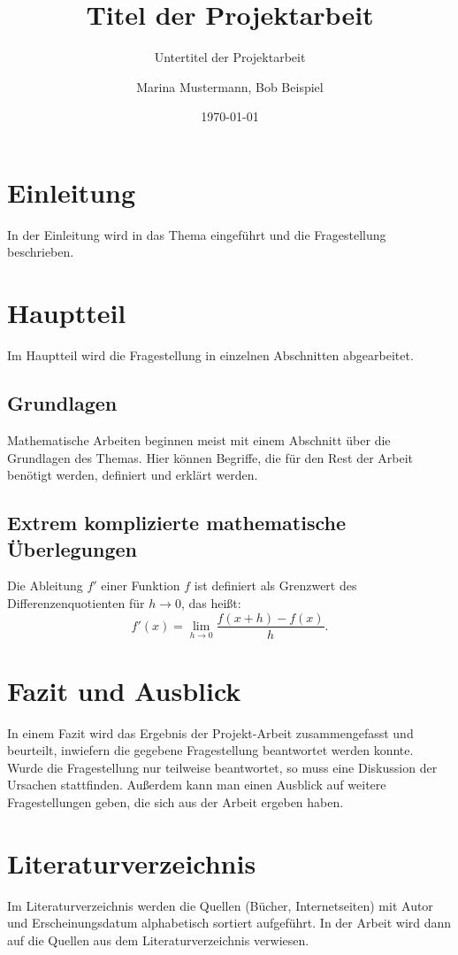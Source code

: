 \documentclass[11pt,parskip=half]{scrartcl} %
\begin{document}
\author{Marina Mustermann, Bob Beispiel}
\title{Titel der Projektarbeit}
\subtitle{Untertitel der Projektarbeit}
\date{\today}
\maketitle

\tableofcontents

\section{Einleitung}
In der Einleitung wird in das Thema eingeführt und die Fragestellung beschrieben.

\section{Hauptteil}
Im Hauptteil wird die Fragestellung in einzelnen Abschnitten abgearbeitet.
\subsection{Grundlagen}
Mathematische Arbeiten beginnen meist mit einem Abschnitt über die Grundlagen des Themas. Hier können Begriffe, die für den Rest der Arbeit benötigt werden, definiert und erklärt werden.
\subsection{Extrem komplizierte mathematische Überlegungen}
Die Ableitung $f'$ einer Funktion $f$ ist definiert als Grenzwert des Differenzenquotienten für $h \rightarrow 0$, das heißt:
\begin{equation}
	f'(x)=\lim_{h \rightarrow 0} \frac{f(x+h)-f(x)}{h}.
\end{equation}

\section{Fazit und Ausblick}
In einem Fazit wird das Ergebnis der Projekt-Arbeit zusammengefasst und beurteilt, inwiefern die gegebene Fragestellung beantwortet werden konnte. Wurde die Fragestellung nur teilweise beantwortet, so muss eine Diskussion der Ursachen stattfinden. Außerdem kann man einen Ausblick auf weitere Fragestellungen geben, die sich aus der Arbeit ergeben haben.

\section{Literaturverzeichnis}
Im Literaturverzeichnis werden die Quellen (Bücher, Internetseiten) mit Autor und Erscheinungsdatum alphabetisch sortiert aufgeführt. In der Arbeit wird dann auf die Quellen aus dem Literaturverzeichnis verwiesen.
\end{document}
